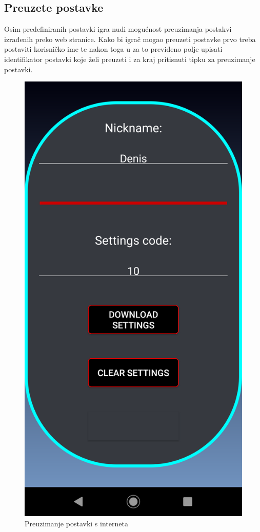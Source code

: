 \documentclass[times, utf8, zavrsni]{fer}
\begin{document}
		\subsection{Preuzete postavke}
		Osim predefiniranih postavki igra nudi mogućnost preuzimanja postakvi izrađenih preko web stranice. Kako bi igrač mogao preuzeti postavke prvo treba postaviti korisničko ime te nakon toga u za to previđeno polje upisati identifikator postavki
		koje želi preuzeti i za kraj pritisnuti tipku za preuzimanje postavki. 
	
		\begin{figure}[H]
			\includegraphics[scale = 0.2]{"slike/downloadsettings.png"} 
			\centering
			\caption{Preuzimanje postavki s interneta}
			\label{fig:preuzimanjepostavki}
		\end{figure}
		
\end{document}

